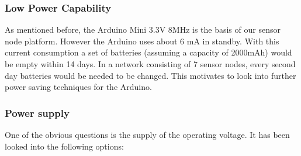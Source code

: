 \subsubsection{Low Power Capability}
\label{sec:lowpower}

As mentioned before, the Arduino Mini 3.3V 8MHz is the basis of our sensor node platform. However the Arduino uses about 6 mA in standby. With this current consumption a set of batteries (assuming a capacity of 2000mAh) would be empty within 14 days. In a network consisting of 7 sensor nodes, every second day batteries would be needed to be changed. This motivates to look into further power saving techniques for the Arduino.\\

\subsubsection{Power supply}

One of the obvious questions is the supply of the operating voltage. It has been looked into the following options:

